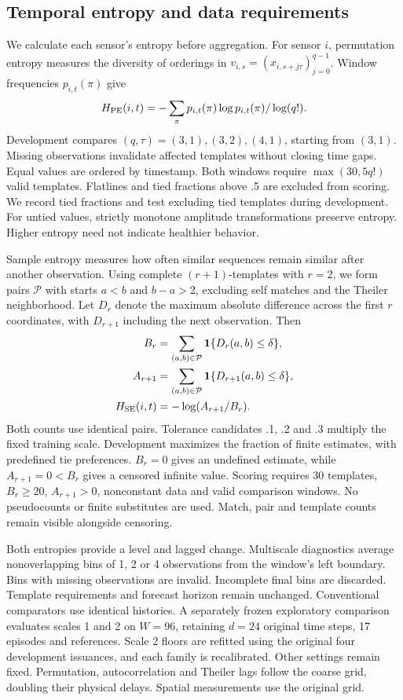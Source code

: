 \documentclass[conference]{IEEEtran}
\begin{document}
\subsection{Temporal entropy and data requirements}
We calculate each sensor's entropy before aggregation. For sensor $i$,
permutation entropy measures the diversity of orderings in
$v_{i,s}=(x_{i,s+j\tau})_{j=0}^{q-1}$. Window frequencies $p_{i,t}(\pi)$ give
\begin{equation}
 H_{\rm PE}(i,t)=-\sum_\pi p_{i,t}(\pi)\log p_{i,t}(\pi)/\log(q!).
 \label{eq:pe}
\end{equation}
Development compares $(q,\tau)=(3,1),(3,2),(4,1)$, starting from $(3,1)$.
Missing observations invalidate affected templates without closing time gaps.
Equal values are ordered by timestamp. Both windows require
$\max(30,5q!)$ valid templates. Flatlines and tied fractions above .5 are
excluded from scoring. We record tied fractions and test excluding tied
templates during development. For untied values, strictly monotone amplitude
transformations preserve entropy. Higher entropy need not indicate healthier
behavior.

Sample entropy measures how often similar sequences remain similar after
another observation. Using complete $(r+1)$-templates with $r=2$,
we form pairs $\mathcal P$ with starts $a<b$ and $b-a>2$, excluding
self matches and the Theiler neighborhood. Let $D_r$ denote the
maximum absolute difference across the first $r$ coordinates, with
$D_{r+1}$ including the next observation. Then
\begin{align}
B_r&=\sum_{(a,b)\in\mathcal P}\mathbf1\{D_r(a,b)\leq\delta\},\\
 A_{r+1}&=\sum_{(a,b)\in\mathcal P}\mathbf1\{D_{r+1}(a,b)\leq\delta\},\\
 H_{\rm SE}(i,t)&=-\log(A_{r+1}/B_r).\label{eq:se}
\end{align}
Both counts use identical pairs. Tolerance candidates .1, .2 and .3 multiply
the fixed training scale. Development maximizes the fraction of finite
estimates, with predefined tie preferences. $B_r=0$ gives an undefined
estimate, while $A_{r+1}=0<B_r$ gives a censored infinite value.
Scoring requires 30 templates, $B_r\geq20$, $A_{r+1}>0$, nonconstant
data and valid comparison windows. No pseudocounts or finite substitutes
are used. Match, pair and template counts remain visible alongside censoring.

Both entropies provide a level and lagged change. Multiscale diagnostics
average nonoverlapping bins of 1, 2 or 4 observations from the window's
left boundary. Bins with missing observations are invalid. Incomplete
final bins are discarded. Template requirements and forecast horizon
remain unchanged. Conventional comparators use identical histories.
A separately frozen exploratory comparison evaluates scales 1 and 2 on
$W=96$, retaining $d=24$ original time steps, 17 episodes and references.
Scale 2 floors are refitted using the original four development issuances,
and each family is recalibrated. Other settings remain fixed. Permutation,
autocorrelation and Theiler lags follow the coarse grid, doubling their
physical delays. Spatial measurements use the original grid.
\end{document}
